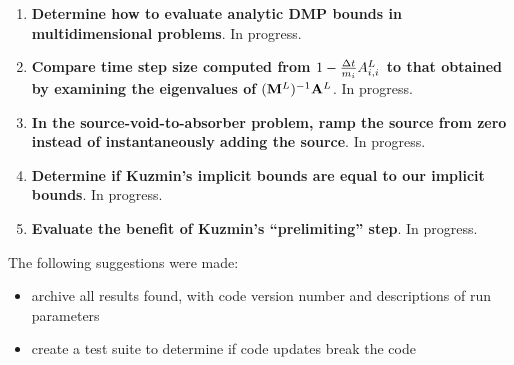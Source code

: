\begin{enumerate}
\item \textbf{Determine how to evaluate analytic DMP bounds in multidimensional problems}.
In progress.
  \item \textbf{Compare time step size computed from $1-\frac{\Delta t}{m_i}A^L_{i,i}$ to
        that obtained by examining the eigenvalues of $(\mathbf{M}^L)^{-1}\mathbf{A}^L$}.
        In progress.
  \item \textbf{In the source-void-to-absorber problem, ramp the source from zero instead of
        instantaneously adding the source}.
        In progress.
  \item \textbf{Determine if Kuzmin's implicit bounds are equal to our implicit bounds}.
        In progress.
  \item \textbf{Evaluate the benefit of Kuzmin's ``prelimiting'' step}.
        In progress.
\end{enumerate}

The following suggestions were made:
\begin{itemize}
  \item archive all results found, with code version number and descriptions of run parameters
  \item create a test suite to determine if code updates break the code
\end{itemize}
